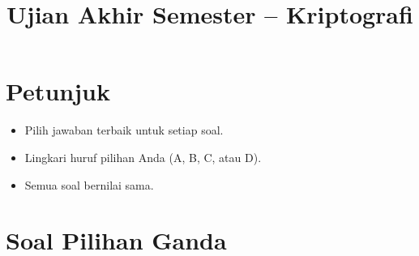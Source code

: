 \documentclass[12pt]{article}
\title{Ujian Akhir Semester – Kriptografi}
\date{}
\begin{document}
\maketitle

\section*{Petunjuk}
\begin{itemize}
    \item Pilih jawaban terbaik untuk setiap soal.
    \item Lingkari huruf pilihan Anda (A, B, C, atau D).
    \item Semua soal bernilai sama.
\end{itemize}

\section*{Soal Pilihan Ganda}
\end{document}
